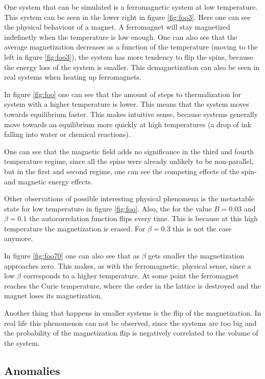 \documentclass[11pt,a4paper]{article}
\begin{document}
One system that can be simulated is a ferromagnetic system at low temperature. This system can be seen in the lower right in figure \ref{fig:foo3}. Here one can see the physical behaviour of a magnet. A ferromagnet will stay magnetized indefinetly when the temperature is low enough. One can also see that the average magnetization decreases as a function of the temperature (moving to the left in figure \ref{fig:foo3}), the system has more tendency to flip the spins, because the energy loss of the system is smaller. This demagnetization can also be seen in real systems when heating up ferromagnets.

In figure \ref{fig:foo} one can see that the amount of steps to thermalization for system with a higher temperature is lower. This means that the system moves towards equilibrium faster. This makes intuitive sense, because systems generally move towards an equilibrium more quickly at high temperatures (a drop of ink falling into water or chemical reactions).

One can see that the magnetic field adds no significance in the third and fourth temperature regime, since all the spins were already unlikely to be non-parallel, but in the first and second regime, one can see the competing effects of the spin- and magnetic energy effects.

Other observations of possible interesting physical phenomena is the metastable state for low temperature in figure \ref{fig:foo}. Also, the for the value $B = 0.03$ and $\beta = 0.1$ the autocorrelation function flips every time. This is because at this high temperature the magnetization is erased. For $\beta = 0.3$ this is not the case anymore.

In figure \ref{fig:foo70} one can also see that as $\beta$ gets smaller the magnetization approaches zero. This makes, as with the ferromagnetic, physical sense, since a low $\beta$ corresponds to a higher temperature. At some point the ferromagnet reaches the Curie temperature, where the order in the lattice is destroyed and the magnet loses its magnetization.

Another thing that happens in smaller systems is the flip of the magnetization. In real life this phenomenon can not be observed, since the systems are too big and the probability of the magnetization flip is negatively correlated to the volume of the system.

\subsection{Anomalies}
\end{document}
